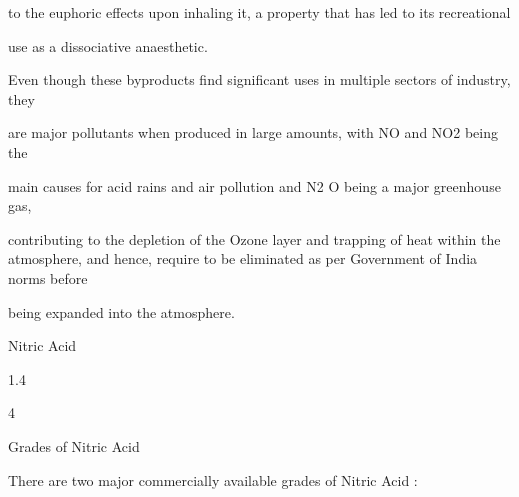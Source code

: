 \documentclass[a4paper,portrait,12pt]{article}
\begin{document}
\begin{flushleft}
to the euphoric effects upon inhaling it, a property that has led to its recreational
\end{flushleft}


\begin{flushleft}
use as a dissociative anaesthetic.
\end{flushleft}


\begin{flushleft}
Even though these byproducts find significant uses in multiple sectors of industry, they
\end{flushleft}


\begin{flushleft}
are major pollutants when produced in large amounts, with NO and NO2 being the
\end{flushleft}


\begin{flushleft}
main causes for acid rains and air pollution and N2 O being a major greenhouse gas,
\end{flushleft}


\begin{flushleft}
contributing to the depletion of the Ozone layer and trapping of heat within the atmosphere, and hence, require to be eliminated as per Government of India norms before
\end{flushleft}


\begin{flushleft}
being expanded into the atmosphere.
\end{flushleft}





\begin{flushleft}
\newpage
Nitric Acid
\end{flushleft}





1.4





4





\begin{flushleft}
Grades of Nitric Acid
\end{flushleft}





\begin{flushleft}
There are two major commercially available grades of Nitric Acid :
\end{flushleft}
\end{document}
